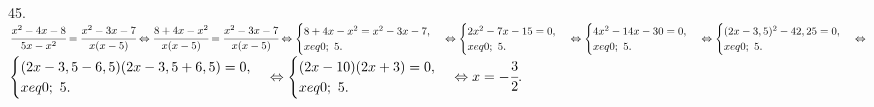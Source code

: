 45. $\cfrac{x^2-4x-8}{5x-x^2}=\cfrac{x^2-3x-7}{x(x-5)}\Leftrightarrow\cfrac{8+4x-x^2}{x(x-5)}=\cfrac{x^2-3x-7}{x(x-5)}\Leftrightarrow
\begin{cases} 8+4x-x^2=x^2-3x-7,\\ x
eq0;\ 5.\end{cases}\Leftrightarrow
\begin{cases} 2x^2-7x-15=0,\\ x
eq0;\ 5.\end{cases}\Leftrightarrow
\begin{cases} 4x^2-14x-30=0,\\ x
eq0;\ 5.\end{cases}\Leftrightarrow
\begin{cases} (2x-3,5)^2-42,25=0,\\ x
eq0;\ 5.\end{cases}\Leftrightarrow$\\$
\begin{cases} (2x-3,5-6,5)(2x-3,5+6,5)=0,\\ x
eq0;\ 5.\end{cases}\Leftrightarrow
\begin{cases} (2x-10)(2x+3)=0,\\ x
eq0;\ 5.\end{cases}\Leftrightarrow
x=-\cfrac{3}{2}.$\\
